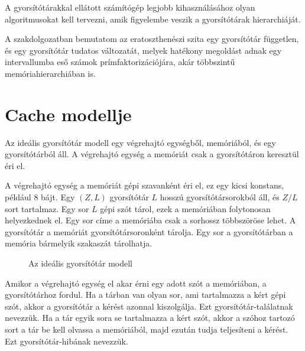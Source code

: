 \documentclass[12pt]{report}
\begin{document}
A gyorsítótárakkal ellátott számítógép legjobb kihasználásához olyan
algoritmusokat kell tervezni, amik figyelembe veszik a gyorsítótárak
hierarchiáját.

A szakdolgozatban bemutatom az eratoszthenészi szita
egy gyorsítótár független, és egy gyorsítótár tudatos változatát,
melyek hatékony megoldást adnak egy intervallumba eső számok
prímfaktorizációjára, akár többszintű memóriahierarchiában is.

\chapter{Cache modellje}

Az ideális gyorsítótár modell\cite{prokop} egy végrehajtó egységből,
memóriából, és egy gyorsítótárból áll.
A végrehajtó egység a memóriát csak a gyorsítótáron keresztül éri el.

A végrehajtó egység a memóriát gépi szavanként éri el,
ez egy kicsi konstans, például 8 bájt.
Egy $(Z, L)$ gyorsítótár $L$ hosszú gyorsítótársorokból áll,
és $Z/L$ sort tartalmaz.
Egy sor $L$ gépi szót tárol, ezek a memóriában folytonosan helyezkednek el.
Egy sor címe a memóriába csak a sorhossz többszöröse lehet.
A gyorsítótár a memóriát gyorsítótársoronként tárolja.
Egy sor a gyorsítótárban a memória bármelyik szakaszát tárolhatja.

\begin{figure}[ht]
\centering
{}
\caption{Az ideális gyorsítótár modell}
\label{fig:cache-model}
\end{figure}

Amikor a végrehajtó egység el akar érni egy adott szót a memóriában,
a gyorsítótárhoz fordul.
Ha a tárban van olyan sor,
ami tartalmazza a kért gépi szót, akkor a gyorsítótár a kérést azonnal kiszolgálja.
Ezt gyorsítótár-találatnak nevezzük.
Ha a tár egyik sora se tartalmazza a kért szót,
akkor a szóhoz tartozó sort a tár be kell olvassa a memóriából,
majd ezután tudja teljesíteni a kérést.
Ezt gyorsítótár-hibának nevezzük.
\end{document}
